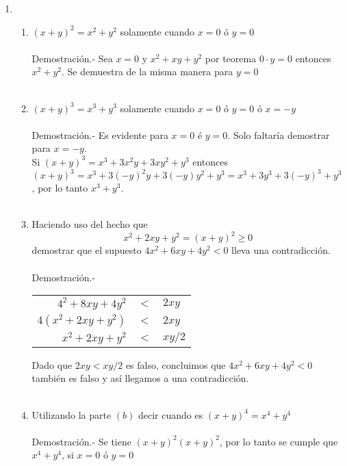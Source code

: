 \begin{enumerate}[\bfseries 1.]
\item 
\begin{enumerate}[\bfseries (a)]
\item $(x+y)^2=x^2+y^2$ solamente cuando $x=0$ ó $y=0$\\\\
Demostración.- \; Sea $x=0$ \; y \; $x^2+xy+y^2$ por teorema $0\cdot y = 0$ entonces $x^2+y^2$. Se demuestra de la misma manera para $y=0$\\\\
\item $(x+y)^3=x^3+y^3$ solamente cuando $x=0$ ó $y=0$ ó $x=-y$\\\\
Demostración.- \; Es evidente para $x=0$ é $y=0$. Solo faltaría demostrar para $x=-y$. \\ Si $(x+y)^3=x^3+3x^2y+3xy^2+y^3$ entonces $(x+y)^3=x^3 +3(-y)^2 y+3(-y)y^2 +y^3=x^3+3y^3+3(-y)^3+y^3$, por lo tanto $x^3+y^3$.\\\\ 

\item Haciendo uso del hecho que $$x^2+2xy+y^2=(x+y)^2 \geq 0$$
demostrar que el supuesto $4x^2 +6xy+4y^2<0$ lleva una contradicción.\\\\
Demostración.- \; 
\begin{center}
\begin{tabular}{r c l}
$4^2+8xy+4y^2$&$<$&$2xy$\\
$4(x^2+2xy+y^2)$&$<$&$2xy$\\
$x^2+2xy+y^2$&$<$&$xy/2$\\
\end{tabular}
\end{center}
Dado que $2xy<xy/2$ es falso, concluimos que $4x^2 +6xy+4y^2<0$ también es falso y así llegamos a una contradicción.\\\\

\item Utilizando la parte $(b)$ decir cuando es $(x+y)^4=x^4+y^4$\\\\
Demostración.- \; Se tiene $(x+y)^2(x+y)^2$, por lo tanto se cumple que $x^4+y^4$, si $x=0$ ó $y=0$\\\\


\end{enumerate}
\end{enumerate}
